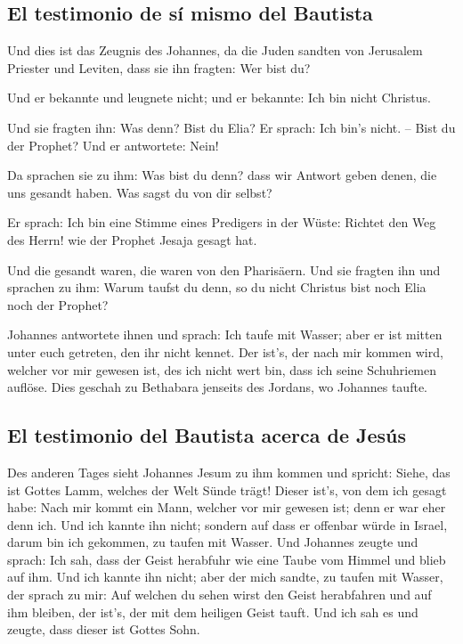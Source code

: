 \hypertarget{el-testimonio-de-suxed-mismo-del-bautista}{%
\subsection{El testimonio de sí mismo del
Bautista}\label{el-testimonio-de-suxed-mismo-del-bautista}}

 Und dies ist das Zeugnis des Johannes, da die Juden
sandten von Jerusalem Priester und Leviten, dass sie ihn fragten: Wer
bist du?

 Und er bekannte und leugnete nicht; und er bekannte: Ich
bin nicht Christus.

 Und sie fragten ihn: Was denn? Bist du Elia? Er sprach:
Ich bin's nicht. -- Bist du der Prophet? Und er antwortete: Nein!

 Da sprachen sie zu ihm: Was bist du denn? dass wir
Antwort geben denen, die uns gesandt haben. Was sagst du von dir selbst?

 Er sprach: Ich bin eine Stimme eines Predigers in der
Wüste: Richtet den Weg des Herrn! wie der Prophet Jesaja gesagt hat.

 Und die gesandt waren, die waren von den Pharisäern.
 Und sie fragten ihn und sprachen zu ihm: Warum taufst du
denn, so du nicht Christus bist noch Elia noch der Prophet?

 Johannes antwortete ihnen und sprach: Ich taufe mit
Wasser; aber er ist mitten unter euch getreten, den ihr nicht kennet.
 Der ist's, der nach mir kommen wird, welcher vor mir
gewesen ist, des ich nicht wert bin, dass ich seine Schuhriemen auflöse.
 Dies geschah zu Bethabara jenseits des Jordans, wo
Johannes taufte.

\hypertarget{el-testimonio-del-bautista-acerca-de-jesuxfas}{%
\subsection{El testimonio del Bautista acerca de
Jesús}\label{el-testimonio-del-bautista-acerca-de-jesuxfas}}

 Des anderen Tages sieht Johannes Jesum zu ihm kommen und
spricht: Siehe, das ist Gottes Lamm, welches der Welt Sünde trägt!
 Dieser ist's, von dem ich gesagt habe: Nach mir kommt
ein Mann, welcher vor mir gewesen ist; denn er war eher denn ich.
 Und ich kannte ihn nicht; sondern auf dass er offenbar
würde in Israel, darum bin ich gekommen, zu taufen mit Wasser.
 Und Johannes zeugte und sprach: Ich sah, dass der Geist
herabfuhr wie eine Taube vom Himmel und blieb auf ihm. 
Und ich kannte ihn nicht; aber der mich sandte, zu taufen mit Wasser,
der sprach zu mir: Auf welchen du sehen wirst den Geist herabfahren und
auf ihm bleiben, der ist's, der mit dem heiligen Geist tauft.
 Und ich sah es und zeugte, dass dieser ist Gottes Sohn.

